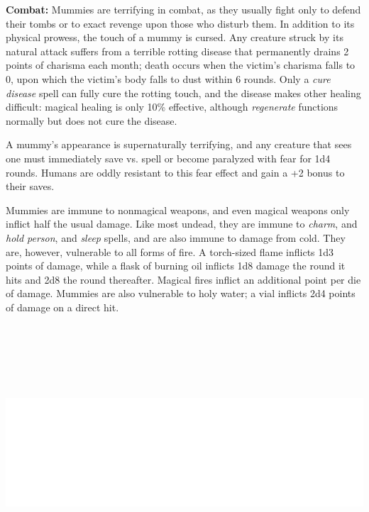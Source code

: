 \begin{multicols}{2}
\textbf{Combat:} Mummies are terrifying in combat, as they usually fight only to defend their tombs or to exact revenge upon those who disturb them. In addition to its physical prowess, the touch of a mummy is cursed. Any creature struck by its natural attack suffers from a terrible rotting disease that permanently drains 2 points of charisma each month; death occurs when the victim's charisma falls to 0, upon which the victim's body falls to dust within 6 rounds. Only a \textit{cure disease} spell can fully cure the rotting touch, and the disease makes other healing difficult: magical healing is only 10\% effective, although \textit{regenerate} functions normally but does not cure the disease.

A mummy's appearance is supernaturally terrifying, and any creature that sees one must immediately save vs. spell or become paralyzed with fear for 1d4 rounds. Humans are oddly resistant to this fear effect and gain a +2 bonus to their saves.

Mummies are immune to nonmagical weapons, and even magical weapons only inflict half the usual damage. Like most undead, they are immune to \textit{charm}, and \textit{hold person}, and \textit{sleep} spells, and are also immune to damage from cold. They are, however, vulnerable to all forms of fire. A torch-sized flame inflicts 1d3 points of damage, while a flask of burning oil inflicts 1d8 damage the round it hits and 2d8 the round thereafter. Magical fires inflict an additional point per die of damage. Mummies are also vulnerable to holy water; a vial inflicts 2d4 points of damage on a direct hit.

\noindent\includegraphics[width=\columnwidth, height=3.75in]{testblock.pdf}


\end{multicols}
